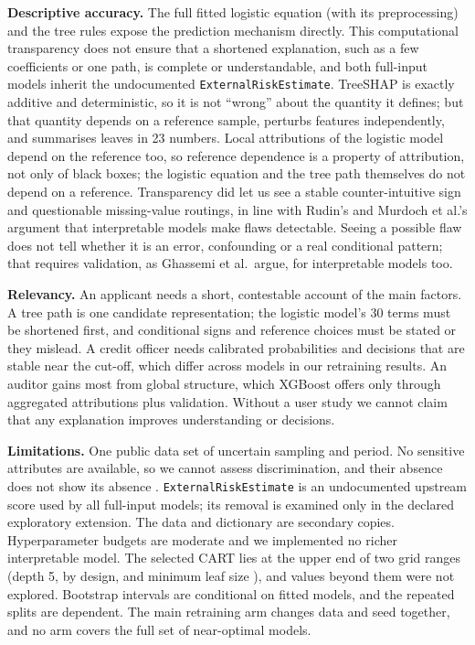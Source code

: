 \documentclass[11pt,a4paper]{article}
\newcommand{\var}[1]{{\small\nolinkurl{#1}}}
\begin{document}
\textbf{Descriptive accuracy.} The full fitted logistic equation (with its preprocessing) and the tree rules expose the prediction mechanism directly. This computational transparency does not ensure that a shortened explanation, such as a few coefficients or one path, is complete or understandable, and both full-input models inherit the undocumented \var{ExternalRiskEstimate}. TreeSHAP is exactly additive and deterministic, so it is not ``wrong'' about the quantity it defines; but that quantity depends on a reference sample, perturbs features independently, and summarises \XGBleaves{} leaves in 23 numbers. Local attributions of the logistic model depend on the reference too, so reference dependence is a property of attribution, not only of black boxes; the logistic equation and the tree path themselves do not depend on a reference. Transparency did let us see a stable counter-intuitive sign and questionable missing-value routings, in line with Rudin's and Murdoch et al.'s argument that interpretable models make flaws detectable. Seeing a possible flaw does not tell whether it is an error, confounding or a real conditional pattern; that requires validation, as Ghassemi et al.\ argue, for interpretable models too.

\textbf{Relevancy.} An applicant needs a short, contestable account of the main factors. A tree path is one candidate representation; the logistic model's 30 terms must be shortened first, and conditional signs and reference choices must be stated or they mislead. A credit officer needs calibrated probabilities and decisions that are stable near the cut-off, which differ across models in our retraining results. An auditor gains most from global structure, which XGBoost offers only through aggregated attributions plus validation. Without a user study we cannot claim that any explanation improves understanding or decisions.

\textbf{Limitations.} One public data set of uncertain sampling and period. No sensitive attributes are available, so we cannot assess discrimination, and their absence does not show its absence \cite{goodman2017eu}. \var{ExternalRiskEstimate} is an undocumented upstream score used by all full-input models; its removal is examined only in the declared exploratory extension. The data and dictionary are secondary copies. Hyperparameter budgets are moderate and we implemented no richer interpretable model. The selected CART lies at the upper end of two grid ranges (depth 5, by design, and minimum leaf size \CARTminleaf{}), and values beyond them were not explored. Bootstrap intervals are conditional on fitted models, and the repeated splits are dependent. The main retraining arm changes data and seed together, and no arm covers the full set of near-optimal models.
\end{document}
